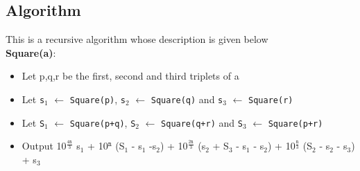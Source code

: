 \documentclass{report}
\begin{document}
 \subsection*{Algorithm}
 This is a recursive algorithm whose description is given below
 \vspace*{1em}\\
 \textbf{Square(a)}:
 \begin{itemize}
     \item Let p,q,r be the first, second and third triplets of a
     \item Let \texttt{s}$_1$ $\leftarrow$ \texttt{Square(p)}, \texttt{s}$_2$ $\leftarrow$ \texttt{Square(q)} and \texttt{s}$_3$ $\leftarrow$ \texttt{Square(r)}
     \item Let \texttt{S}$_1$ $\leftarrow$ \texttt{Square(p+q)}, \texttt{S}$_2$ $\leftarrow$ \texttt{Square(q+r)}  and \texttt{S}$_3$ $\leftarrow$ \texttt{Square(p+r)}
     \item Output 10$^{\frac{4\mathtt{n}}{3}}$ s$_1$ + 10$^{\mathtt{n}}$ (S$_1$ - s$_1$ -s$_2$) + 10$^{\frac{2\mathtt{n}}{3}}$ (s$_2$ + S$_3$ - s$_1$ - s$_2$) + 10$^{\frac{\mathtt{n}}{3}}$ (S$_2$ - s$_2$ - s$_3$) + s$_3$   
 \end{itemize}\newpage
\end{document}
